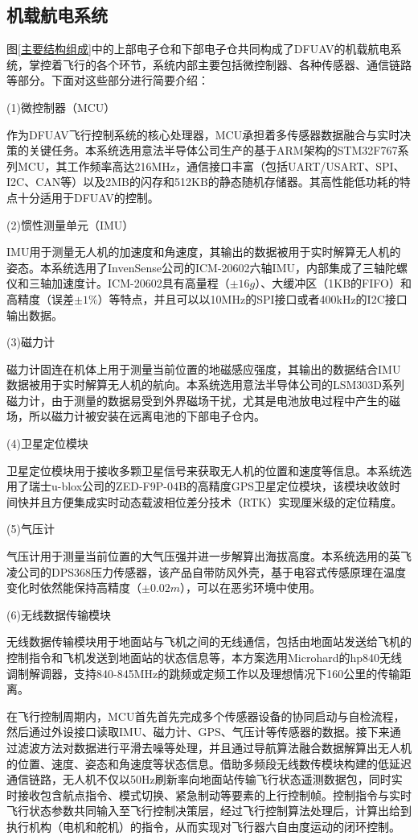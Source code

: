 \subsection{机载航电系统}

图\ref{主要结构组成}中的上部电子仓和下部电子仓共同构成了DFUAV的机载航电系统，掌控着飞行的各个环节，系统内部主要包括微控制器、各种传感器、通信链路等部分。下面对这些部分进行简要介绍：

(1)微控制器（MCU）

    作为DFUAV飞行控制系统的核心处理器，MCU承担着多传感器数据融合与实时决策的关键任务。本系统选用意法半导体公司生产的基于ARM架构的STM32F767系列MCU，其工作频率高达216MHz，通信接口丰富（包括UART/USART、SPI、I2C、CAN等）以及2MB的闪存和512KB的静态随机存储器。其高性能低功耗的特点十分适用于DFUAV的控制。

(2)惯性测量单元（IMU）

    IMU用于测量无人机的加速度和角速度，其输出的数据被用于实时解算无人机的姿态。本系统选用了InvenSense公司的ICM-20602六轴IMU，内部集成了三轴陀螺仪和三轴加速度计。ICM-20602具有高量程（$\pm16g$）、大缓冲区（1KB的FIFO）和高精度（误差$\pm1\%$）等特点，并且可以以10MHz的SPI接口或者400kHz的I2C接口输出数据。

(3)磁力计

    磁力计固连在机体上用于测量当前位置的地磁感应强度，其输出的数据结合IMU数据被用于实时解算无人机的航向。本系统选用意法半导体公司的LSM303D系列磁力计，由于测量的数据易受到外界磁场干扰，尤其是电池放电过程中产生的磁场，所以磁力计被安装在远离电池的下部电子仓内。

(4)卫星定位模块

    卫星定位模块用于接收多颗卫星信号来获取无人机的位置和速度等信息。本系统选用了瑞士u-blox公司的ZED-F9P-04B的高精度GPS卫星定位模块，该模块收敛时间快并且方便集成实时动态载波相位差分技术（RTK）实现厘米级的定位精度。
    
(5)气压计

    气压计用于测量当前位置的大气压强并进一步解算出海拔高度。本系统选用的英飞凌公司的DPS368压力传感器，该产品自带防风外壳，基于电容式传感原理在温度变化时依然能保持高精度（$\pm0.02m$），可以在恶劣环境中使用。

(6)无线数据传输模块

    无线数据传输模块用于地面站与飞机之间的无线通信，包括由地面站发送给飞机的控制指令和飞机发送到地面站的状态信息等，本方案选用Microhard的hp840无线调制解调器，支持840-845MHz的跳频或定频工作以及理想情况下160公里的传输距离。

在飞行控制周期内，MCU首先首先完成多个传感器设备的协同启动与自检流程，然后通过外设接口读取IMU、磁力计、GPS、气压计等传感器的数据。接下来通过滤波方法对数据进行平滑去噪等处理，并且通过导航算法融合数据解算出无人机的位置、速度、姿态和角速度等状态信息。借助多频段无线数传模块构建的低延迟通信链路，无人机不仅以50Hz刷新率向地面站传输飞行状态遥测数据包，同时实时接收包含航点指令、模式切换、紧急制动等要素的上行控制帧。控制指令与实时飞行状态参数共同输入至飞行控制决策层，经过飞行控制算法处理后，计算出给到执行机构（电机和舵机）的指令，从而实现对飞行器六自由度运动的闭环控制。


